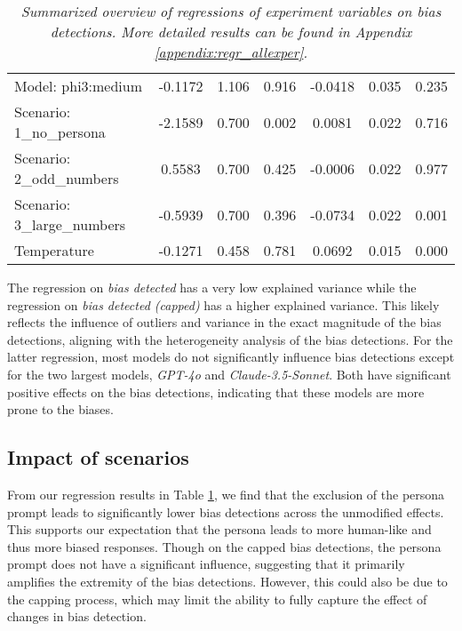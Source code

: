 \begin{table}[h!]
{\begin{tabular}{lccc|ccc}
        Model: phi3:medium & -0.1172 & 1.106 & 0.916 & -0.0418 & 0.035 & 0.235 \\
        Scenario: 1\_no\_persona & -2.1589 & 0.700 & 0.002 & 0.0081 & 0.022 & 0.716 \\
        Scenario: 2\_odd\_numbers & 0.5583 & 0.700 & 0.425 & -0.0006 & 0.022 & 0.977 \\
        Scenario: 3\_large\_numbers & -0.5939 & 0.700 & 0.396 & -0.0734 & 0.022 & 0.001 \\
        Temperature & -0.1271 & 0.458 & 0.781 & 0.0692 & 0.015 & 0.000 \\
        \hline
    \end{tabular}
    }
    \caption[Summary of regressions of experiment variables on bias detections]{\centering  \textit{Summarized overview of regressions of experiment variables on bias detections. More detailed results can be found in Appendix \ref{appendix:regr_allexper}.}}
    \label{tab:summary_regr_allexper}
\end{table}


\par The regression on \textit{bias detected} has a very low explained variance while the regression on \textit{bias detected (capped)} has a higher explained variance. This likely reflects the influence of outliers and variance in the exact magnitude of the bias detections, aligning with the heterogeneity analysis of the bias detections. For the latter regression, most models do not significantly influence bias detections except for the two largest models, \textit{GPT-4o} and \textit{Claude-3.5-Sonnet}. Both have significant positive effects on the bias detections, indicating that these models are more prone to the biases.


\subsection{Impact of scenarios}
\label{results:scenarioimpact}
\par From our regression results in Table \ref{tab:summary_regr_allexper}, we find that the exclusion of the persona prompt leads to significantly lower bias detections across the unmodified effects. This supports our expectation that the persona leads to more human-like and thus more biased responses. Though on the capped bias detections, the persona prompt does not have a significant influence, suggesting that it primarily amplifies the extremity of the bias detections. However, this could also be due to the capping process, which may limit the ability to fully capture the effect of changes in bias detection.

